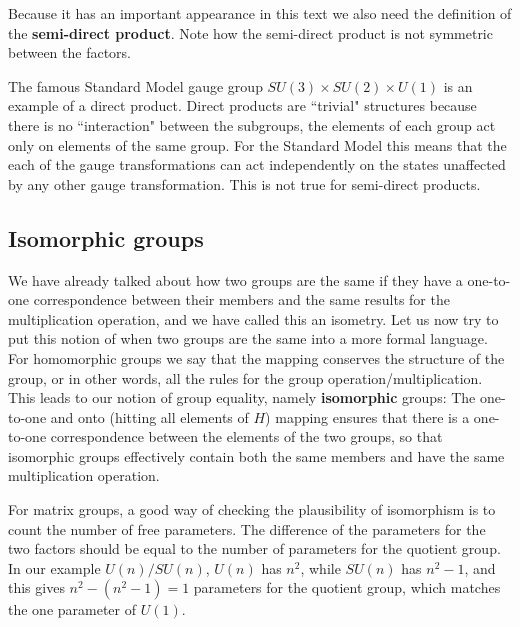 \documentclass[notes.tex]{subfiles}
\begin{document}
Because it has an important appearance in this text we also need the definition of the {\bf semi-direct product}.
Note how the semi-direct product is not symmetric between the factors.

The famous Standard Model gauge group $SU(3) \times SU(2)\times U(1)$ is an example of a direct product. Direct products are ``trivial" structures because there is no ``interaction" between the subgroups, the elements of each group act only on elements of the same group. For the Standard Model this means that the each of the gauge transformations can act independently on the states unaffected by any other gauge transformation. This is not true for semi-direct products. 


\subsection{Isomorphic groups}
We have already talked about how two groups are the same if they have a one-to-one correspondence between their members and the same results for the multiplication operation, and we have called this an isometry. Let us now try to put this notion of when two groups are the same into a more formal language.
For homomorphic groups we say that the mapping conserves the structure of the group, or in other words, all the rules for the group operation/multiplication. This leads to our notion of group equality, namely {\bf isomorphic} groups:
The one-to-one and onto (hitting all elements of $H$) mapping ensures that there is a one-to-one correspondence between the elements of the two groups, so that isomorphic groups effectively contain both the same members and have the same multiplication operation.

For matrix groups, a good way of checking the plausibility of isomorphism is to count the number of free parameters. The difference of the parameters for the two factors should be equal to the number of parameters for the quotient group. In our example $U(n)/SU(n)$, $U(n)$ has $n^2$, while $SU(n)$ has $n^2-1$, and this gives $n^2-(n^2-1)=1$ parameters for the quotient group, which matches the one parameter of $U(1)$. 
\end{document}
